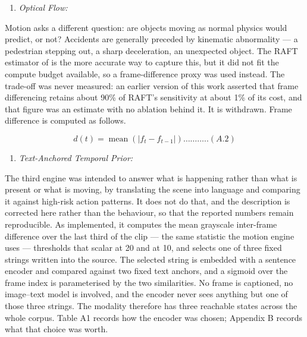 \begin{enumerate}
\def\labelenumi{3.\arabic{enumi}}
\setcounter{enumi}{1}
\item
  \emph{Optical Flow:}
\end{enumerate}

Motion asks a different question: are objects moving as normal physics would predict, or not? Accidents are generally preceded by kinematic abnormality --- a pedestrian stepping out, a sharp deceleration, an unexpected object. The RAFT estimator of \citet{teed2020raft} is the more accurate way to capture this, but it did not fit the compute budget available, so a frame-difference proxy was used instead. The trade-off was never measured: an earlier version of this work asserted that frame differencing retains about 90\% of RAFT's sensitivity at about 1\% of its cost, and that figure was an estimate with no ablation behind it. It is withdrawn. Frame difference is computed as follows.

\[d(t) = \operatorname{mean}\left( \left| f_{t} - f_{t-1} \right| \right)\ldots\ldots\ldots..(A.2)\]

\begin{enumerate}
\def\labelenumi{3.\arabic{enumi}}
\setcounter{enumi}{2}
\item
  \emph{Text-Anchored Temporal Prior:}
\end{enumerate}

The third engine was intended to answer what is happening rather than what is present or what is moving, by translating the scene into language and comparing it against high-risk action patterns. It does not do that, and the description is corrected here rather than the behaviour, so that the reported numbers remain reproducible. As implemented, it computes the mean grayscale inter-frame difference over the last third of the clip --- the same statistic the motion engine uses --- thresholds that scalar at 20 and at 10, and selects one of three fixed strings written into the source. The selected string is embedded with a sentence encoder and compared against two fixed text anchors, and a sigmoid over the frame index is parameterised by the two similarities. No frame is captioned, no image--text model is involved, and the encoder never sees anything but one of those three strings. The modality therefore has three reachable states across the whole corpus. Table A1 records how the encoder was chosen; Appendix B records what that choice was worth.


